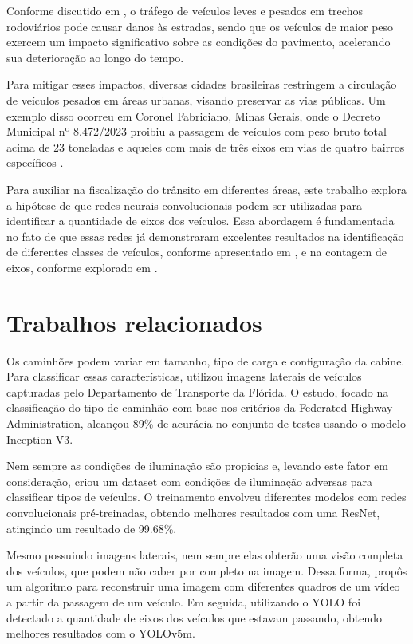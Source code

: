 \documentclass[12pt]{article}
\begin{document}
    Conforme discutido em \cite{damage_on_roads}, o tráfego de veículos leves e pesados em trechos rodoviários pode causar danos às estradas, sendo que os veículos de maior peso exercem um impacto significativo sobre as condições do pavimento, acelerando sua deterioração ao longo do tempo.
    
    Para mitigar esses impactos, diversas cidades brasileiras restringem a circulação de veículos pesados em áreas urbanas, visando preservar as vias públicas. Um exemplo disso ocorreu em Coronel Fabriciano, Minas Gerais, onde o Decreto Municipal nº 8.472/2023 proibiu a passagem de veículos com peso bruto total acima de 23 toneladas e aqueles com mais de três eixos em vias de quatro bairros específicos \cite{prefeitura_de_coronel_fabriciano}.
    
    Para auxiliar na fiscalização do trânsito em diferentes áreas, este trabalho explora a hipótese de que redes neurais convolucionais podem ser utilizadas para identificar a quantidade de eixos dos veículos. Essa abordagem é fundamentada no fato de que essas redes já demonstraram excelentes resultados na identificação de diferentes classes de veículos, conforme apresentado em \cite{iluminacao_adversa}, e na contagem de eixos, conforme explorado em \cite{marcomini2023truckaxledetectionconvolutional}.

\section{Trabalhos relacionados}

    Os caminhões podem variar em tamanho, tipo de carga e configuração da cabine. Para classificar essas características, \cite{Almutairi2022} utilizou imagens laterais de veículos capturadas pelo Departamento de Transporte da Flórida. O estudo, focado na classificação do tipo de caminhão com base nos critérios da Federated Highway Administration, alcançou 89\% de acurácia no conjunto de testes usando o modelo Inception V3.

    Nem sempre as condições de iluminação são propicias e, levando este fator em consideração, \cite{iluminacao_adversa} criou um dataset com condições de iluminação adversas para classificar tipos de veículos. O treinamento envolveu diferentes modelos com redes convolucionais pré-treinadas, obtendo melhores resultados com uma ResNet, atingindo um resultado de 99.68\%.

    Mesmo possuindo imagens laterais, nem sempre elas obterão uma visão completa dos veículos, que podem não caber por completo na imagem. Dessa forma, \cite{Souza2024} propôs um algoritmo para reconstruir uma imagem com diferentes quadros de um vídeo a partir da passagem de um veículo. Em seguida, utilizando o YOLO foi detectado a quantidade de eixos dos veículos que estavam passando, obtendo melhores resultados com o YOLOv5m.
\end{document}
